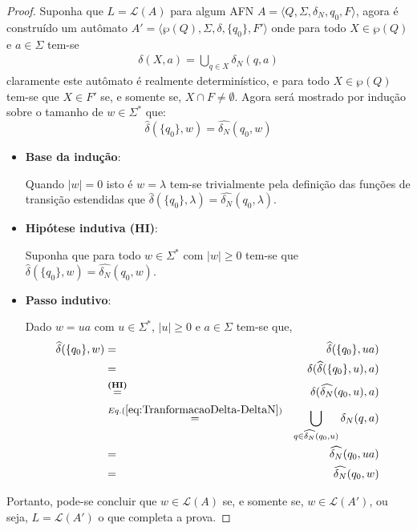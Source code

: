 \begin{proof}
	Suponha que $L = \mathcal{L}(A)$ para algum AFN $A = \langle Q, \Sigma, \delta_N, q_0, F\rangle$, agora é construído um  autômato $A' = \langle \wp(Q), \Sigma, \delta, \{q_0\}, F' \rangle$ onde para todo $X \in \wp(Q)$ e $a \in \Sigma$ tem-se
	\begin{eqnarray}\label{eq:TranformacaoDelta-DeltaN}
		\delta(X, a) = \bigcup_{q \in X} \delta_N(q, a)
	\end{eqnarray}
	claramente este autômato é realmente determinístico, e para todo $X \in \wp(Q)$  tem-se que $X \in F'$ se, e somente se, $X \cap F \neq \emptyset$. Agora será mostrado por indução sobre o tamanho de $w \in \Sigma^*$ que:
	$$\widehat{\delta}(\{q_0\}, w) = \widehat{\delta_N}(q_0, w)$$
	\begin{itemize}
		\item \textbf{Base da indução}:
		
		Quando $|w| = 0$ isto é $w = \lambda$ tem-se trivialmente pela definição das funções de transição estendidas que $\widehat{\delta}(\{q_0\}, \lambda) = \widehat{\delta_N}(q_0, \lambda)$.
		
		\item \textbf{Hipótese indutiva (HI)}:
		
		Suponha que para todo $w \in \Sigma^*$ com $|w| \geq 0$ tem-se que $\widehat{\delta}(\{q_0\}, w) = \widehat{\delta_N}(q_0, w)$.
		\item \textbf{Passo indutivo}:
		
		Dado $w = ua$ com $u \in \Sigma^*$, $|u| \geq 0$ e $a \in \Sigma$ tem-se que, 
		\begin{eqnarray*}
			\widehat{\delta}(\{q_0\}, w) & = & \widehat{\delta}(\{q_0\}, ua)\\
			& = & \delta(\widehat{\delta}(\{q_0\}, u), a)\\
			& \stackrel{\textbf{(HI)}}{=} & \delta(\widehat{\delta_N}(q_0, u), a)\\
			& \stackrel{Eq. (\ref{eq:TranformacaoDelta-DeltaN})}{=} & \bigcup_{q \in \widehat{\delta_N}(q_0, u)} \delta_N(q, a)\\
			& = & \widehat{\delta_N}(q_0, ua)\\
			& = & \widehat{\delta_N}(q_0, w)
		\end{eqnarray*}
	\end{itemize}
	Portanto, pode-se concluir que $w \in \mathcal{L}(A)$ se, e somente se, $w \in \mathcal{L}(A')$, ou seja, $L = \mathcal{L}(A')$ o que completa a prova.
\end{proof}

